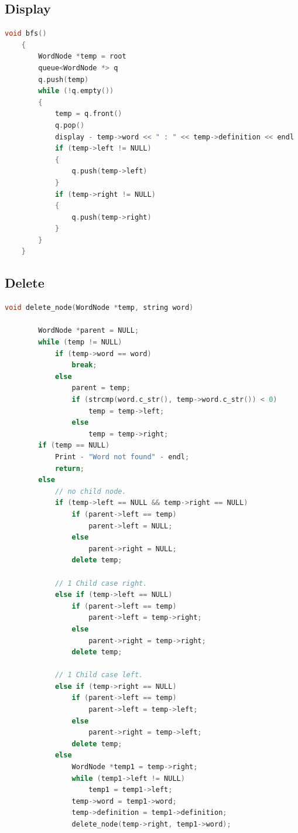\documentclass[11pt]{article}
\begin{document}
\subsection{Display}
\begin{lstlisting}[language=C++]
    void bfs()
    {
        WordNode *temp = root
        queue<WordNode *> q
        q.push(temp)
        while (!q.empty())
        {
            temp = q.front()
            q.pop()
            display - temp->word << " : " << temp->definition << endl
            if (temp->left != NULL)
            {
                q.push(temp->left)
            }
            if (temp->right != NULL)
            {
                q.push(temp->right)
            }
        }
    }
\end{lstlisting}
\subsection{Delete}
\begin{lstlisting}[language=C++]
	void delete_node(WordNode *temp, string word)
    
        WordNode *parent = NULL;
        while (temp != NULL)
            if (temp->word == word)
                break;
            else
                parent = temp;
                if (strcmp(word.c_str(), temp->word.c_str()) < 0)
                    temp = temp->left;
                else
                    temp = temp->right;
        if (temp == NULL)
            Print - "Word not found" - endl;
            return;
        else
            // no child node.
            if (temp->left == NULL && temp->right == NULL)
                if (parent->left == temp)
                    parent->left = NULL;
                else
                    parent->right = NULL;
                delete temp;

			// 1 Child case right.
            else if (temp->left == NULL)
                if (parent->left == temp)
                    parent->left = temp->right;
                else
                    parent->right = temp->right;
                delete temp;

			// 1 Child case left. 
            else if (temp->right == NULL)
                if (parent->left == temp)
                    parent->left = temp->left;
                else
                    parent->right = temp->left;
                delete temp;
            else
                WordNode *temp1 = temp->right;
                while (temp1->left != NULL)
                    temp1 = temp1->left;
                temp->word = temp1->word;
                temp->definition = temp1->definition;
                delete_node(temp->right, temp1->word);
    
\end{lstlisting}
\end{document}
